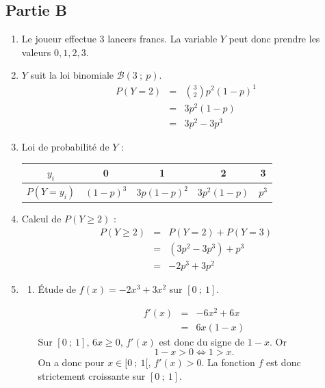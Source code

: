 \subsection*{Partie B}
\begin{enumerate}
\item Le joueur effectue 3 lancers francs. La variable $Y$ peut donc prendre les valeurs $0, 1, 2, 3$.

\item $Y$ suit la loi binomiale $\mathcal{B}(3~;~p)$.
\[
\begin{array}{rcl}
P(Y = 2) &=& \binom{3}{2} p^2 (1 - p)^1 \\
&=& 3p^2(1 - p) \\
&=& 3p^2 - 3p^3
\end{array}
\]

\item Loi de probabilité de $Y$ :
\begin{center}
\renewcommand{\arraystretch}{1.5}
\begin{tabular}{|c|c|c|c|c|}
\hline
$y_i$ & 0 & 1 & 2 & 3 \\
\hline
$P(Y = y_i)$ & $(1 - p)^3$ & $3p(1 - p)^2$ & $3p^2(1 - p)$ & $p^3$ \\
\hline
\end{tabular}
\end{center}

\item Calcul de $P(Y \geqslant 2)$ :
\[
\begin{array}{rcl}
P(Y \geqslant 2) &=& P(Y = 2) + P(Y = 3) \\
&=& (3p^2 - 3p^3) + p^3 \\
&=& -2p^3 + 3p^2
\end{array}
\]

\item
\begin{enumerate}
\item Étude de $f(x) = -2x^3 + 3x^2$ sur $[0~;~1]$.

\[\begin{array}{rcl}
f'(x) &=& -6x^2 + 6x \\
&=& 6x(1 - x)
\end{array}\]
Sur $[0~;~1]$, $6x \geqslant 0$, $f'(x)$ est donc du signe de  $1 - x $. Or \[1 - x > 0 \iff 1 >x.\] On a donc pour $x \in [0~;~1[$,\: $f'(x) > 0$. La fonction $f$ est donc strictement croissante sur $[0~;~1]$.

\begin{center}
\end{center}


\end{enumerate}
\end{enumerate}

